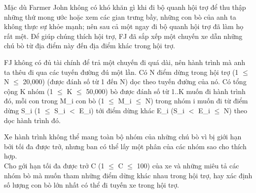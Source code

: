 Mặc dù Farmer John không có khó khăn gì khi đi bộ quanh hội trợ để thu thập những thứ mong ước hoặc xem các gian trưng bầy, những con bò của anh ta không thực sự khỏe mạnh; nên sau cả một ngay đi bộ quanh hội trợ đã làm họ rất mệt. Để giúp chúng thích hội trợ, FJ đã sắp xếp một chuyến xe dẫn những chú bò từ địa điểm này đến địa điểm khác trong hội trợ.  

   FJ không có đủ tài chính để trả một chuyến đi quá dài, nên hành trình mà  anh ta thêu đi qua các tuyến đường đú một lần. Có N điểm dừng trong hội  trợ (1  $\le$  N  $\le$  20,000) (được đánh số từ 1 đến N) dọc theo tuyến đường của  nó. Có tổng cộng K nhóm (1  $\le$  K  $\le$  50,000) bò được đánh số từ 1..K muốn đi hành trình đó, mỗi con trong M\_i con bò (1  $\le$  M\_i  $\le$  N) trong nhóm i  muốn đi từ điểm dừng S\_i (1  $\le$  S\_i $<$ E\_i) tới điểm dừng khác E\_i  (S\_i $<$ E\_i  $\le$  N) theo dọc hành trình đó.  

   Xe hành trình không thể mang toàn bộ nhóm của những chú bò vì bị giới hạn  bởi tối đa được trở, nhưng ban có thể lấy một phân của các nhóm sao cho thích hợp.   
\\

   Cho gới hạn tối đa được trở C (1  $\le$  C  $\le$  100) của xe và những miêu tả các  nhóm bò mà muốn tham những điểm dừng khác nhau trong hội trợ, hay xác định  số lượng con bò lớn nhất có thể đi tuyến xe trong hội trợ.